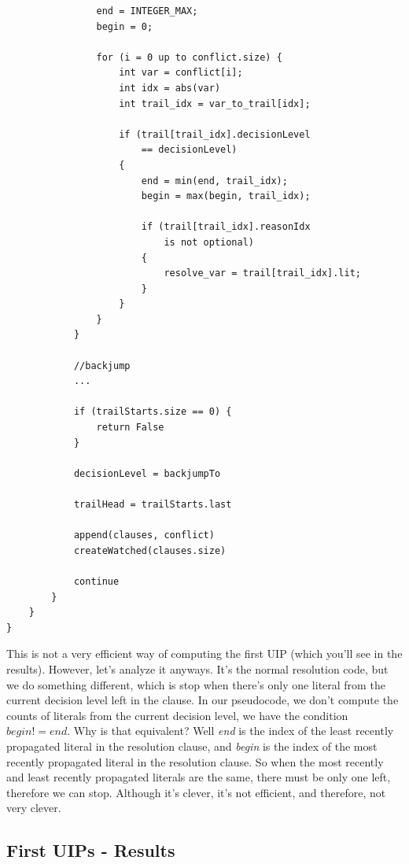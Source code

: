 \documentclass[../main.tex]{subfiles}
\begin{document}
\begin{lstlisting}
                end = INTEGER_MAX;
                begin = 0;

                for (i = 0 up to conflict.size) {
                    int var = conflict[i];
                    int idx = abs(var)
                    int trail_idx = var_to_trail[idx];

                    if (trail[trail_idx].decisionLevel 
                        == decisionLevel)
                    {
                        end = min(end, trail_idx);
                        begin = max(begin, trail_idx);

                        if (trail[trail_idx].reasonIdx 
                            is not optional)
                        {
                            resolve_var = trail[trail_idx].lit;
                        }
                    }
                }
            } 

            //backjump
            ...

            if (trailStarts.size == 0) {
                return False
            }

            decisionLevel = backjumpTo

            trailHead = trailStarts.last

            append(clauses, conflict)
            createWatched(clauses.size)

            continue
        }
    }
}
\end{lstlisting}

This is not a very efficient way of computing the first UIP (which you'll see in the 
results). However, let's analyze it anyways. It's the normal resolution code, but we 
do something different, which is stop when there's only one literal from the current 
decision level left in the clause. In our pseudocode, we don't compute the counts of 
literals from the current decision level, we have the condition $begin != end$. Why is 
that equivalent? Well \textit{end} is the index of the least recently propagated literal 
in the resolution clause, and \textit{begin} is the index of the most recently propagated 
literal in the resolution clause. So when the most recently and least recently propagated 
literals are the same, there must be only one left, therefore we can stop. Although it's 
clever, it's not efficient, and therefore, not very clever.

\subsection{First UIPs - Results}
\end{document}
